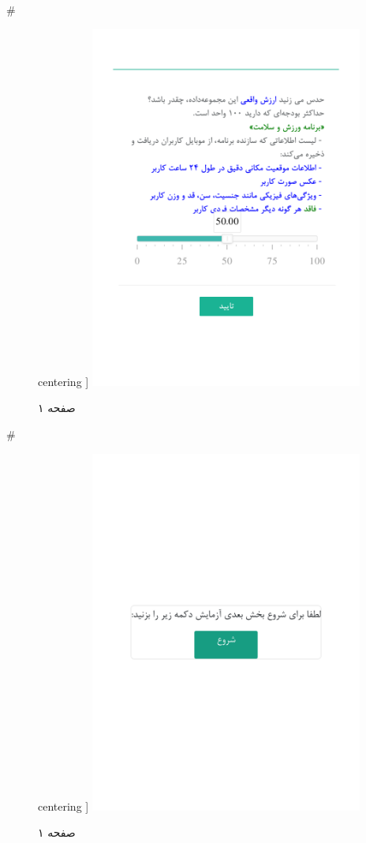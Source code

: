 { 
 # 
\begin{figure}[htpb]
centering ]
\includegraphics[width=0.8\textwidth]{./img/Task74.png/}
\caption{صفحه ۱}
\label{fig:Task1}
\end{figure}
 
 
 # 
\begin{figure}[htpb]
centering ]
\includegraphics[width=0.8\textwidth]{./img/Task75.png/}
\caption{صفحه ۱}
\label{fig:Task1}
\end{figure}
 
}
